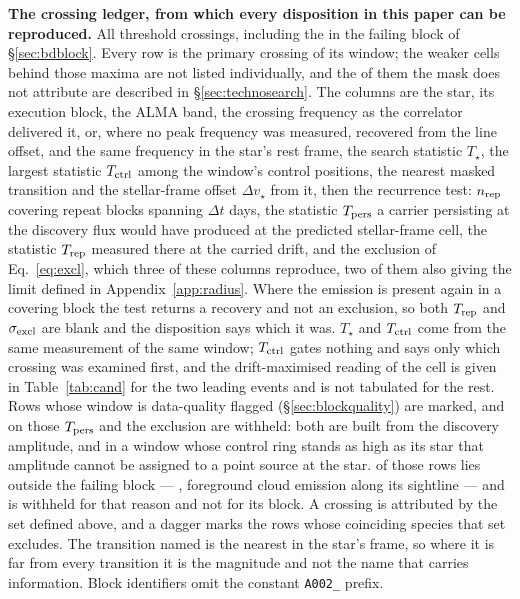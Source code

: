 \begin{table}
\centering
\caption{\textbf{The crossing ledger, from which every disposition in this
paper can be reproduced.} All \EvNCrossRaw{} threshold crossings,
including the \EvNCrossFlag{} in the failing block of \S\ref{sec:bdblock}.
Every row is the primary crossing of its window; the \CkNSecondary{} weaker
cells behind those maxima are not listed individually, and the
\CkNSecUnattrWord{} of them the mask does not attribute are described in
\S\ref{sec:technosearch}. The columns are
the star, its execution block, the ALMA band, the crossing
frequency as the correlator delivered it, or, where no peak frequency was
measured, recovered from the line offset, and the same frequency in the star's
rest frame, the search statistic $T_\star$, the largest statistic
$T_{\rm ctrl}$ among the window's \NCtrl{} control positions, the nearest
masked transition and the stellar-frame offset $\Delta v_\star$ from it, then
the recurrence test: $n_{\rm rep}$ covering repeat blocks spanning $\Delta t$
days, the statistic $T_{\rm pers}$ a carrier persisting at the discovery flux
would have produced at the predicted stellar-frame cell, the statistic
$T_{\rm rep}$ measured there at the carried drift, and the exclusion of
Eq.~\ref{eq:excl}, which three of these columns reproduce, two of them also
giving the limit defined in Appendix~\ref{app:radius}. Where the emission is
present again in a covering block the test returns a recovery and not an
exclusion, so both $T_{\rm rep}$ and $\sigma_{\rm excl}$ are blank and the
disposition says which it was.
$T_\star$ and $T_{\rm ctrl}$ come from the same measurement of the
same window; $T_{\rm ctrl}$ gates nothing and says only which crossing was
examined first, and the drift-maximised reading of the cell is given in
Table~\ref{tab:cand} for the two leading events and is not tabulated for
the rest. Rows whose window is data-quality flagged
(\S\ref{sec:blockquality}) are marked, and on those $T_{\rm pers}$ and the
exclusion are withheld: both are built from the discovery amplitude, and in a
window whose control ring stands as high as its star that amplitude cannot be
assigned to a point source at the star. \BkFlagNCrossOther{} of those rows
lies outside the failing block --- \BkFlagOtherStar, foreground cloud
emission along its sightline --- and
is withheld for that reason and not for its block. A crossing is attributed
by the set defined above, and a dagger marks the \MkNSODecide{} rows whose
coinciding species that set excludes. The transition named is the nearest in
the star's frame, so where it is far from every transition it is the magnitude
and not the name that carries information. Block identifiers omit the constant
\texttt{A002\_} prefix.}
\label{tab:ledger}
\scriptsize

\end{table}

